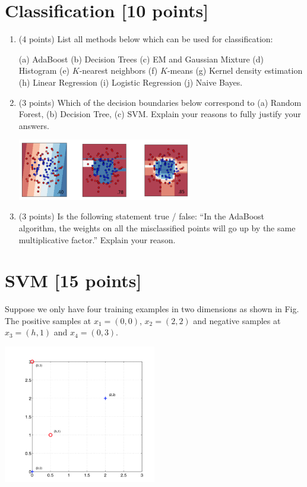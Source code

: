 \documentclass[a4paper,12pt,fleqn]{article}
\begin{document}
\clearpage
\section{Classification [10 points]}

\begin{enumerate}
\item (4 points) List all methods below which can be used for classification:

(a) AdaBoost (b) Decision Trees (c) EM and Gaussian Mixture (d) Histogram (e) $K$-nearest neighbors (f) $K$-means (g) Kernel density estimation 
(h) Linear Regression (i) Logistic Regression (j) Naive Bayes. 



\vspace{1.3in}

\item (3 points) Which of the decision boundaries below correspond to (a) Random Forest, (b) Decision Tree, (c) SVM. Explain your reasons  to fully justify your answers. 
%
\begin{center}
\includegraphics[width = 0.6\textwidth]{./fig/decision}
\end{center}

\vspace{1in}

\item (3 points) Is the following statement true / false: ``In the AdaBoost algorithm, the weights on all the
misclassified points will go up by the same multiplicative factor.'' Explain your reason.

\end{enumerate}


\clearpage
\section{SVM [15 points]}

Suppose we only have four training examples in two dimensions as shown in Fig. The positive samples at $x_1 = (0, 0)$, $x_2 = (2, 2)$ and negative samples at $x_3 = (h, 1)$ and $x_4 = (0, 3)$. 
%
\begin{center}
\includegraphics[width = 0.5\textwidth]{./fig/svm}
\end{center}
\end{document}
